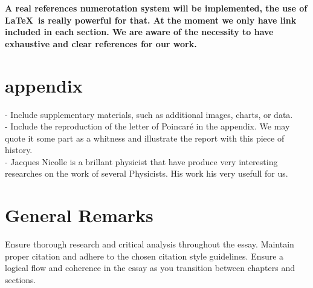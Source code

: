 \documentclass[a4paper,12pt]{report}
\begin{document}
\textbf{A real references numerotation system will be implemented, the use of  \LaTeX\ is really powerful for that. At the moment we only have link included in each section. We are aware of the necessity to have exhaustive and clear references for our work. }\\[1ex]

\printbibliography[type=book, heading=subbibliography,title={Books}]
\printbibliography[type=article, heading=subbibliography, title={Articles}]
\printbibliography[type=online,heading=subbibliography, title={Online Resources}]
\printbibliography[type=misc, heading=subbibliography, title={Other Documents}]
\appendix
\section*{\Huge{appendix}}
- Include supplementary materials, such as additional images, charts, or data.\\
- Include the reproduction of the letter of Poincaré in the appendix. We may quote it some part as a whitness and illustrate the report with this piece of history. \\
- Jacques Nicolle is a brillant physicist that have produce very interesting researches on the work of several Physicists. His work his very usefull for us.
\section*{General Remarks}
Ensure thorough research and critical analysis throughout the essay. Maintain proper citation and adhere to the chosen citation style guidelines. Ensure a logical flow and coherence in the essay as you transition between chapters and sections.
\end{document}
